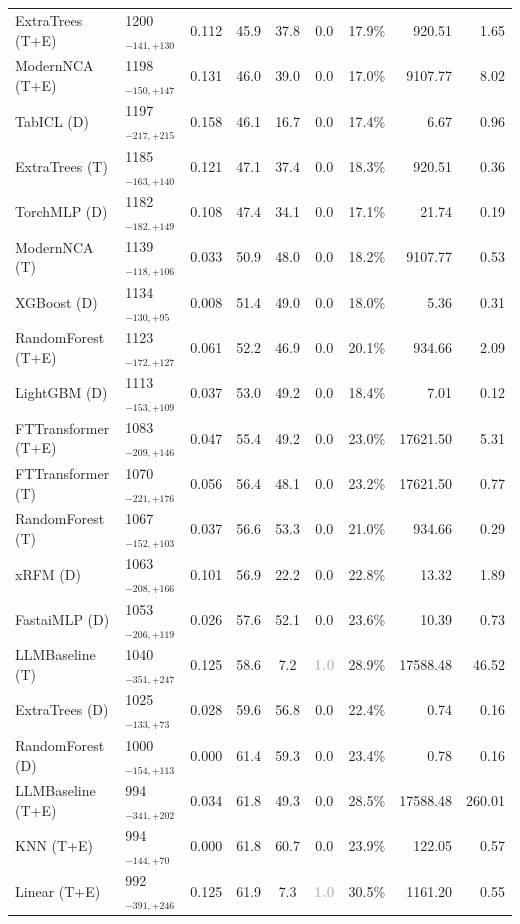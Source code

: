 \begin{tabular}{llcccccrr}
ExtraTrees (T+E) & 1200${}_{-141,+130}$ & 0.112 & 45.9 & 37.8 & 0.0 & 17.9\% & 920.51 & 1.65 \\
ModernNCA (T+E) & 1198${}_{-150,+147}$ & 0.131 & 46.0 & 39.0 & 0.0 & 17.0\% & 9107.77 & 8.02 \\
TabICL (D) & 1197${}_{-217,+215}$ & 0.158 & 46.1 & 16.7 & 0.0 & 17.4\% & 6.67 & 0.96 \\
ExtraTrees (T) & 1185${}_{-163,+140}$ & 0.121 & 47.1 & 37.4 & 0.0 & 18.3\% & 920.51 & 0.36 \\
TorchMLP (D) & 1182${}_{-182,+149}$ & 0.108 & 47.4 & 34.1 & 0.0 & 17.1\% & 21.74 & 0.19 \\
ModernNCA (T) & 1139${}_{-118,+106}$ & 0.033 & 50.9 & 48.0 & 0.0 & 18.2\% & 9107.77 & 0.53 \\
XGBoost (D) & 1134${}_{-130,+95}$ & 0.008 & 51.4 & 49.0 & 0.0 & 18.0\% & 5.36 & 0.31 \\
RandomForest (T+E) & 1123${}_{-172,+127}$ & 0.061 & 52.2 & 46.9 & 0.0 & 20.1\% & 934.66 & 2.09 \\
LightGBM (D) & 1113${}_{-153,+109}$ & 0.037 & 53.0 & 49.2 & 0.0 & 18.4\% & 7.01 & 0.12 \\
FTTransformer (T+E) & 1083${}_{-209,+146}$ & 0.047 & 55.4 & 49.2 & 0.0 & 23.0\% & 17621.50 & 5.31 \\
FTTransformer (T) & 1070${}_{-221,+176}$ & 0.056 & 56.4 & 48.1 & 0.0 & 23.2\% & 17621.50 & 0.77 \\
RandomForest (T) & 1067${}_{-152,+103}$ & 0.037 & 56.6 & 53.3 & 0.0 & 21.0\% & 934.66 & 0.29 \\
xRFM (D) & 1063${}_{-208,+166}$ & 0.101 & 56.9 & 22.2 & 0.0 & 22.8\% & 13.32 & 1.89 \\
FastaiMLP (D) & 1053${}_{-206,+119}$ & 0.026 & 57.6 & 52.1 & 0.0 & 23.6\% & 10.39 & 0.73 \\
LLMBaseline (T) & 1040${}_{-351,+247}$ & 0.125 & 58.6 & 7.2 & \textcolor{silver}{\textbf{1.0}} & 28.9\% & 17588.48 & 46.52 \\
ExtraTrees (D) & 1025${}_{-133,+73}$ & 0.028 & 59.6 & 56.8 & 0.0 & 22.4\% & 0.74 & 0.16 \\
RandomForest (D) & 1000${}_{-154,+113}$ & 0.000 & 61.4 & 59.3 & 0.0 & 23.4\% & 0.78 & 0.16 \\
LLMBaseline (T+E) & 994${}_{-341,+202}$ & 0.034 & 61.8 & 49.3 & 0.0 & 28.5\% & 17588.48 & 260.01 \\
KNN (T+E) & 994${}_{-144,+70}$ & 0.000 & 61.8 & 60.7 & 0.0 & 23.9\% & 122.05 & 0.57 \\
Linear (T+E) & 992${}_{-391,+246}$ & 0.125 & 61.9 & 7.3 & \textcolor{silver}{\textbf{1.0}} & 30.5\% & 1161.20 & 0.55 \\

\end{tabular}
